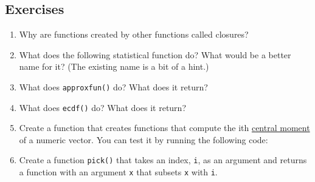 \hypertarget{exercises-1}{%
\subsection{Exercises}\label{exercises-1}}

\begin{enumerate}
\def\labelenumi{\arabic{enumi}.}
\item
  Why are functions created by other functions called closures?
\item
  What does the following statistical function do? What would be a
  better name for it? (The existing name is a bit of a hint.)

\begin{Shaded}
\begin{Highlighting}[]
\StringTok{ }
  \OperatorTok{==}\StringTok{ }\NormalTok{) \{}
\NormalTok{  \} }\NormalTok{ \{}
    \OperatorTok{^}\StringTok{ }\OperatorTok{-}\StringTok{ }\NormalTok{) }\OperatorTok{/}\StringTok{ }
\NormalTok{  \}}
\NormalTok{\}}
\end{Highlighting}
\end{Shaded}
\item
  What does \texttt{approxfun()} do? What does it return?
\item
  What does \texttt{ecdf()} do? What does it return?
\item
  Create a function that creates functions that compute the ith
  \href{http://en.wikipedia.org/wiki/Central_moment}{central moment} of
  a numeric vector. You can test it by running the following code:

\begin{Shaded}
\begin{Highlighting}[]
\StringTok{ }\NormalTok{(}\NormalTok{)}
\StringTok{ }\NormalTok{(}\NormalTok{)}

\StringTok{ }\NormalTok{(}\NormalTok{)}
\NormalTok{(}\NormalTok{(}\NormalTok{))}
\NormalTok{(}\NormalTok{(}\OperatorTok{*}\StringTok{ } \OperatorTok{/}\StringTok{ }\NormalTok{))}
\end{Highlighting}
\end{Shaded}
\item
  Create a function \texttt{pick()} that takes an index, \texttt{i}, as
  an argument and returns a function with an argument \texttt{x} that
  subsets \texttt{x} with \texttt{i}.


\end{enumerate}
